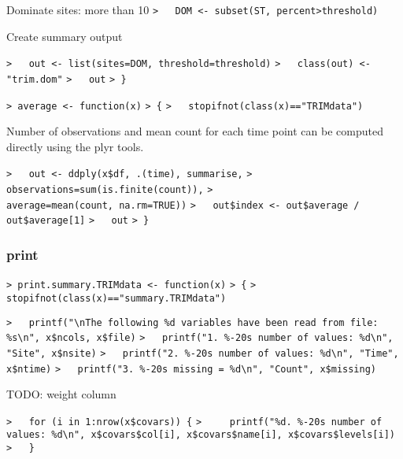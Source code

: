 \documentclass[a4paper]{article}
\begin{document}
Dominate sites: more than 10%
\verb~>   DOM <- subset(ST, percent>threshold)~\par

Create summary output\par
\verb~>   out <- list(sites=DOM, threshold=threshold)~\newline
\verb~>   class(out) <- "trim.dom"~\newline
\verb~>   out~\newline
\verb~> }~\par

\verb~> average <- function(x)~\newline
\verb~> {~\newline
\verb~>   stopifnot(class(x)=="TRIMdata")~\par

Number of observations and mean count for each  time point can be computed
directly using the plyr tools.\par
\verb~>   out <- ddply(x$df, .(time), summarise,~\newline
\verb~>                observations=sum(is.finite(count)),~\newline
\verb~>                average=mean(count, na.rm=TRUE))~\newline
\verb~>   out$index <- out$average / out$average[1]~\newline
\verb~>   out~\newline
\verb~> }~\par



\subsubsection{print}\par

\verb~> print.summary.TRIMdata <- function(x)~\newline
\verb~> {~\newline
\verb~>   stopifnot(class(x)=="summary.TRIMdata")~\par

\verb~>   printf("\nThe following %d variables have been read from file: %s\n", x$ncols, x$file)~\newline
\verb~>   printf("1. %-20s number of values: %d\n", "Site", x$nsite)~\newline
\verb~>   printf("2. %-20s number of values: %d\n", "Time", x$ntime)~\newline
\verb~>   printf("3. %-20s missing = %d\n", "Count", x$missing)~\par
TODO: weight column\par
\verb~>   for (i in 1:nrow(x$covars)) {~\newline
\verb~>     printf("%d. %-20s number of values: %d\n", x$covars$col[i], x$covars$name[i], x$covars$levels[i])~\newline
\verb~>   }~\par
\end{document}
